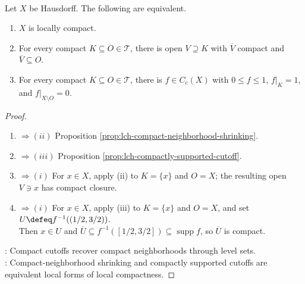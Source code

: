 \begin{theorem} \label{thm:lch-equivalent-compact-cutoff-package} \\
Let $X$ be Hausdorff. The following are equivalent.
\begin{enumerate}[label=(\roman*)]
\setlength{\itemsep}{0pt}
\item $X$ is locally compact.
\item For every compact $K\subseteq O\in\mathcal{T}$, there is open $V\supseteq K$ with $\overline{V}$ compact and $\overline{V}\subseteq O$.
\item For every compact $K\subseteq O\in\mathcal{T}$, there is $f\in C_c(X)$ with $0\leq f\leq1$, $f|_K=1$, and $f|_{X\setminus O}=0$.
\end{enumerate}
\begin{proof}
\begin{enumerate}[label=(\roman*)]
\setlength{\itemsep}{0pt}
\item[$(i)$]$\Rightarrow (ii)$ Proposition \ref{prop:lch-compact-neighborhood-shrinking}.
\item[$(i)$]$\Rightarrow (iii)$ Proposition \ref{prop:lch-compactly-supported-cutoff}.
\item[$(ii)$]$\Rightarrow (i)$ For $x\in X$, apply (ii) to $K=\{x\}$ and $O=X$; the resulting open $V\ni x$ has compact closure.
\item[$(iii)$]$\Rightarrow (i)$ For $x\in X$, apply (iii) to $K=\{x\}$ and $O=X$, and set $U\defeq f^{-1}((1/2,3/2))$.\\
Then $x\in U$ and $\overline{U}\subseteq f^{-1}([1/2,3/2])\subseteq\operatorname{supp}f$, so $\overline{U}$ is compact.
\end{enumerate}
: Compact cutoffs recover compact neighborhoods through level sets.\\
: Compact-neighborhood shrinking and compactly supported cutoffs are equivalent local forms of local compactness.
\end{proof}
\end{theorem}

